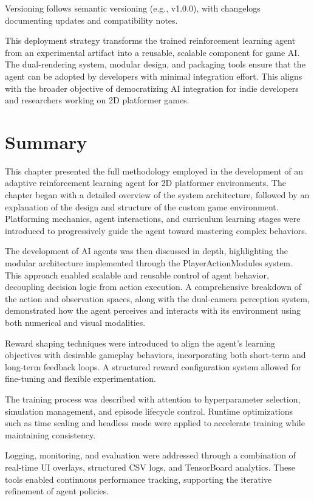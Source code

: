 \documentclass[12pt,oneside,openright,a4paper]{cpe-english-project}
\begin{document}
Versioning follows semantic versioning (e.g., v1.0.0), with changelogs documenting updates and compatibility notes.

This deployment strategy transforms the trained reinforcement learning agent from an experimental artifact into a reusable, scalable component for game AI. The dual-rendering system, modular design, and packaging tools ensure that the agent can be adopted by developers with minimal integration effort. This aligns with the broader objective of democratizing AI integration for indie developers and researchers working on 2D platformer games.

\section{Summary}

This chapter presented the full methodology employed in the development of an adaptive reinforcement learning agent for 2D platformer environments. The chapter began with a detailed overview of the system architecture, followed by an explanation of the design and structure of the custom game environment. Platforming mechanics, agent interactions, and curriculum learning stages were introduced to progressively guide the agent toward mastering complex behaviors.  

The development of AI agents was then discussed in depth, highlighting the modular architecture implemented through the PlayerActionModules system. This approach enabled scalable and reusable control of agent behavior, decoupling decision logic from action execution. A comprehensive breakdown of the action and observation spaces, along with the dual-camera perception system, demonstrated how the agent perceives and interacts with its environment using both numerical and visual modalities.  

Reward shaping techniques were introduced to align the agent's learning objectives with desirable gameplay behaviors, incorporating both short-term and long-term feedback loops. A structured reward configuration system allowed for fine-tuning and flexible experimentation.  

The training process was described with attention to hyperparameter selection, simulation management, and episode lifecycle control. Runtime optimizations such as time scaling and headless mode were applied to accelerate training while maintaining consistency.  

Logging, monitoring, and evaluation were addressed through a combination of real-time UI overlays, structured CSV logs, and TensorBoard analytics. These tools enabled continuous performance tracking, supporting the iterative refinement of agent policies.  
\end{document}
